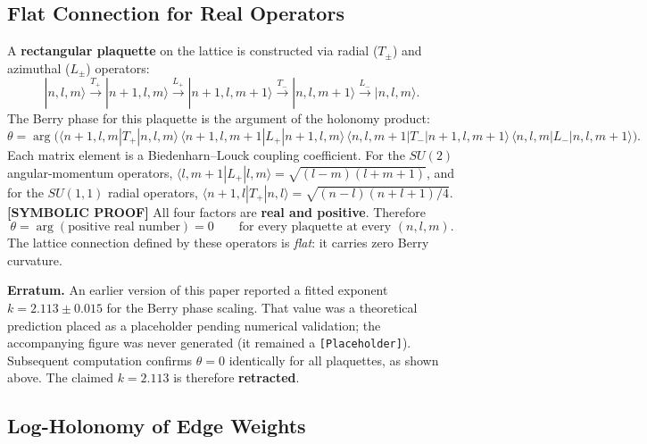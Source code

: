 \documentclass[aps,pra,twocolumn,superscriptaddress,longbibliography]{revtex4-2}
\begin{document}
\subsection{Flat Connection for Real Operators}

A \textbf{rectangular plaquette} on the lattice is constructed via radial
($T_\pm$) and azimuthal ($L_\pm$) operators:
\begin{equation}
|n, l, m\rangle \xrightarrow{T_+} |n+1, l, m\rangle \xrightarrow{L_+}
|n+1, l, m+1\rangle \xrightarrow{T_-} |n, l, m+1\rangle \xrightarrow{L_-}
|n, l, m\rangle.
\label{eq:plaquette}
\end{equation}
The Berry phase for this plaquette is the argument of the holonomy product:
\begin{equation}
\theta = \arg\!\bigl(
  \langle n\!+\!1,l,m|T_+|n,l,m\rangle\,
  \langle n\!+\!1,l,m\!+\!1|L_+|n\!+\!1,l,m\rangle\,
  \langle n,l,m\!+\!1|T_-|n\!+\!1,l,m\!+\!1\rangle\,
  \langle n,l,m|L_-|n,l,m\!+\!1\rangle
\bigr).
\label{eq:berry_arg}
\end{equation}
Each matrix element is a Biedenharn--Louck coupling coefficient.  For the
$SU(2)$ angular-momentum operators,
$\langle l,m\!+\!1|L_+|l,m\rangle = \sqrt{(l-m)(l+m+1)}$,
and for the $SU(1,1)$ radial operators,
$\langle n\!+\!1,l|T_+|n,l\rangle = \sqrt{(n-l)(n+l+1)/4}$.
\textbf{[SYMBOLIC PROOF]} All four factors are \textbf{real and positive}.  Therefore
\begin{equation}
\theta = \arg(\text{positive real number}) = 0
\qquad\text{for every plaquette at every $(n,l,m)$.}
\label{eq:berry_zero}
\end{equation}
The lattice connection defined by these operators is \emph{flat}: it carries
zero Berry curvature.

\textbf{Erratum.}  An earlier version of this paper reported a fitted
exponent $k = 2.113 \pm 0.015$ for the Berry phase scaling.  That value was
a theoretical prediction placed as a placeholder pending numerical
validation; the accompanying figure was never generated (it remained a
\texttt{[Placeholder]}).  Subsequent computation confirms
$\theta = 0$ identically for all plaquettes, as shown above.  The claimed
$k = 2.113$ is therefore \textbf{retracted}.

\subsection{Log-Holonomy of Edge Weights}
\end{document}
